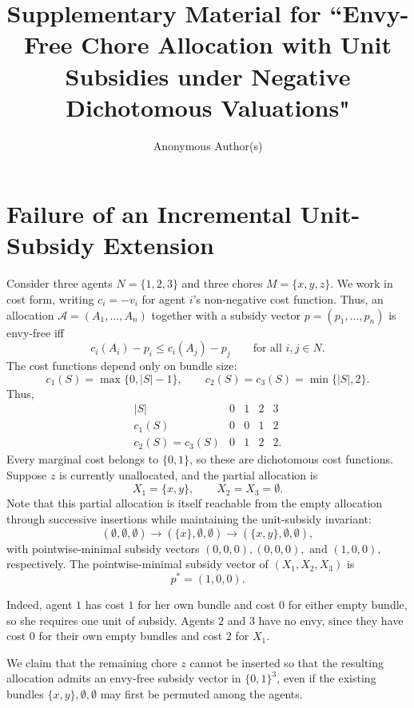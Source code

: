 \documentclass[sigconf,anonymous,nonacm]{aamas}
\title{Supplementary Material for
``Envy-Free Chore Allocation with Unit Subsidies under Negative
Dichotomous Valuations"}
\author{Anonymous Author(s)}
\begin{document}
\maketitle

\pagestyle{supplementstyle}
\thispagestyle{supplementstyle}




\section{Failure of an Incremental Unit-Subsidy Extension}
\label{sec:whynotbkns}


\begin{example}
\label{app:extension-failure}

Consider three agents $N=\{1,2,3\}$ and three chores $M=\{x,y,z\}$. We work in cost form, writing
\( c_i=-v_i \)
for agent \(i\)'s non-negative cost function. Thus, an allocation \(\mathcal A=(A_1,\ldots,A_n)\) together with a subsidy vector \(p=(p_1,\ldots,p_n)\) is envy-free iff
\[ c_i(A_i)-p_i\le c_i(A_j)-p_j
\qquad\text{for all } i,j\in N.
\]
The cost functions depend only on bundle size: \[ c_1(S)=\max\{0,|S|-1\}, \qquad c_2(S)=c_3(S)=\min\{|S|,2\}. \] Thus, \[
\begin{array}{c|cccc}
|S| & 0 & 1 & 2 & 3\\
\hline
c_1(S) & 0 & 0 & 1 & 2\\
c_2(S)=c_3(S) & 0 & 1 & 2 & 2 .
\end{array}
\] Every marginal cost belongs to $\{0,1\}$, so these are dichotomous cost functions. Suppose  $z$ is currently unallocated, and the partial allocation is \[
X_1=\{x,y\},
\qquad
X_2=X_3=\emptyset.
\] Note that this partial allocation is itself reachable from the empty allocation through successive insertions while maintaining the unit-subsidy invariant:
\[
(\emptyset,\emptyset,\emptyset)
\longrightarrow
(\{x\},\emptyset,\emptyset)
\longrightarrow
(\{x,y\},\emptyset,\emptyset),
\] with pointwise-minimal subsidy vectors
\(
(0,0,0), (0,0,0),\text{ and } (1,0,0),
\) respectively. The pointwise-minimal subsidy vector of $(X_1,X_2,X_3)$ is \[
p^*=(1,0,0).
\]

Indeed, agent $1$ has cost $1$ for her own bundle and cost $0$ for either empty bundle, so she requires one unit of subsidy. Agents $2$ and $3$ have no envy, since they have cost $0$ for their own empty bundles and cost $2$ for $X_1$.

We claim that the remaining chore $z$ cannot be inserted so that the resulting allocation admits an envy-free subsidy vector in $\{0,1\}^3$, even if the existing bundles $\{x,y\},\emptyset,\emptyset$ may first be permuted among the agents.


\end{example}
\end{document}

